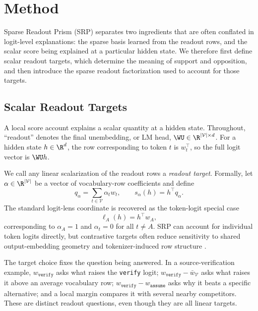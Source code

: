 \section{Method}
\label{sec:method}

Sparse Readout Prism (SRP) separates two ingredients that are often conflated
in logit-level explanations: the sparse basis learned from the readout rows, and
the scalar score being explained at a particular hidden state. We therefore
first define scalar readout targets, which determine the meaning of support and
opposition, and then introduce the sparse readout factorization used to account
for those targets.

\subsection{Scalar Readout Targets}
\label{sec:problem-setup}

A local score account explains a scalar quantity at a hidden state. Throughout,
``readout'' denotes the final unembedding, or LM head,
\(\WU\in\R^{|\mathcal{V}|\times d}\). For a hidden state \(h\in\R^d\), the row
corresponding to token \(t\) is \(w_t^\top\), so the full logit vector is
\(\WU h\).

We call any linear scalarization of the readout rows a \emph{readout target}.
Formally, let \(\alpha\in\R^{|\mathcal{V}|}\) be a vector of vocabulary-row
coefficients and define
\[
    q_\alpha
    =
    \sum_{t\in\mathcal{V}}\alpha_t w_t,
    \qquad
    s_\alpha(h)
    =
    h^\top q_\alpha .
\]
The standard logit-lens coordinate is recovered as the token-logit special case
\[
    \ell_A(h)=h^\top w_A,
\]
corresponding to \(\alpha_A=1\) and \(\alpha_t=0\) for all \(t\neq A\). SRP can
account for individual token logits directly, but contrastive targets often
reduce sensitivity to shared output-embedding geometry and tokenizer-induced row
structure
\citep{press2017outputembedding,inan2017tying,yang2018softmaxbottleneck,bostrom2020bpe}.

The target choice fixes the question being answered. In a source-verification
example, \(w_{\texttt{verify}}\) asks what raises the \texttt{verify} logit;
\(w_{\texttt{verify}}-\bar{w}_{\mathcal{V}}\) asks what raises it above an
average vocabulary row; \(w_{\texttt{verify}}-w_{\texttt{assume}}\) asks why it
beats a specific alternative; and a local margin compares it with several nearby
competitors. These are distinct readout questions, even though they are all
linear targets.

